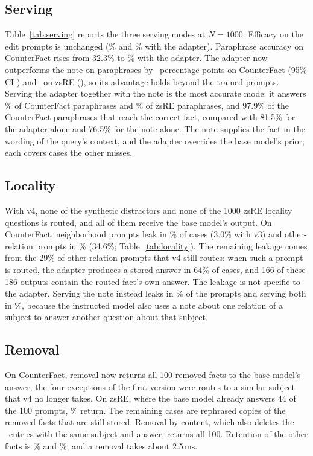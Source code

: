 \documentclass[journal,10pt]{IEEEtran}
\begin{document}
\subsection{Serving}
Table~\ref{tab:serving} reports the three serving modes at $N=1000$. Efficacy on the edit
prompts is unchanged (\vCfEffPct\% and \vZsEffPct\% with the adapter). Paraphrase accuracy
on CounterFact rises from 32.3\% to \vCfParaPct\% with the adapter. The adapter now
outperforms the note on paraphrases by \vCfParaDiff\ percentage points on CounterFact
(95\% CI \vCfParaDiffCI) and \vZsParaDiff\ on zsRE (\vZsParaDiffCI), so its advantage holds
beyond the trained prompts. Serving the adapter together with the note is the most
accurate mode: it answers \vCfParaBothPct\% of CounterFact paraphrases and \vZsParaBothPct\%
of zsRE paraphrases, and 97.9\% of the CounterFact paraphrases that reach the correct fact,
compared with 81.5\% for the adapter alone and 76.5\% for the note alone. The note supplies
the fact in the wording of the query's context, and the adapter overrides the base model's
prior; each covers cases the other misses.

\subsection{Locality}
\label{sec:locres}
With v4, none of the synthetic distractors and none of the 1000 zsRE locality questions
is routed, and all of them receive the base model's output. On CounterFact, neighborhood
prompts leak in \vCfEtwoLeakPct\% of cases (3.0\% with v3) and other-relation prompts in
\vCfEthreeLeakPct\% (34.6\%; Table~\ref{tab:locality}). The remaining leakage comes from
the 29\% of other-relation prompts that v4 still routes: when such a prompt is routed, the
adapter produces a stored answer in 64\% of cases, and 166 of these 186 outputs contain
the routed fact's own answer. The leakage is not specific to the adapter. Serving the note
instead leaks in \vCfEthreeLeakNotePct\% of the prompts and serving both in
\vCfEthreeLeakBothPct\%, because the instructed model also uses a note about one relation
of a subject to answer another question about that subject.

\subsection{Removal}
On CounterFact, removal now returns all 100 removed facts to the base model's answer; the
four exceptions of the first version were routes to a similar subject that v4 no longer
takes. On zsRE, where the base model already answers 44 of the 100 prompts, \vZsReturnPct\%
return. The remaining cases are rephrased copies of the removed facts that are still
stored. Removal by content, which also deletes the \vZsContentExtra\ entries with the same
subject and answer, returns all 100. Retention of the other facts is \vCfRetainPct\% and
\vZsRetainPct\%, and a removal takes about 2.5\,ms.
\end{document}
